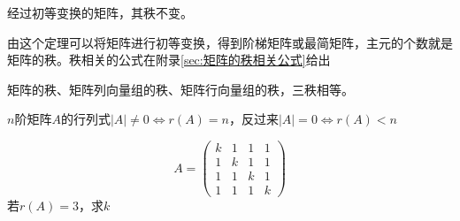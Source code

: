 \begin{theorem}
    经过初等变换的矩阵，其秩不变。
\end{theorem}
由这个定理可以将矩阵进行初等变换，得到阶梯矩阵或最简矩阵，主元的个数就是矩阵的秩。秩相关的公式在附录\ref{sec:矩阵的秩相关公式}给出
\begin{theorem}
    矩阵的秩、矩阵列向量组的秩、矩阵行向量组的秩，三秩相等。
\end{theorem}
\begin{theorem}
    $n$阶矩阵$A$的行列式$|A|\neq 0 \iff r(A) = n$，反过来$|A|=0\iff r(A)< n$
\end{theorem}
\begin{example}
    \[
        A =
        \begin{pmatrix}
            k & 1 & 1 & 1 \\
            1 & k & 1 & 1 \\
            1 & 1 & k & 1 \\
            1 & 1 & 1 & k
        \end{pmatrix}
    \]
    若$r(A)=3$，求$k$
\end{example}
